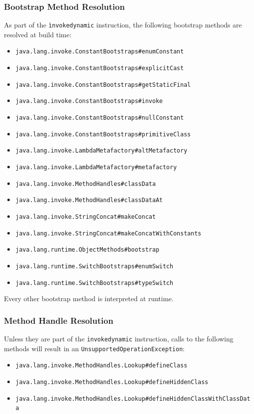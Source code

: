 \subsubsection{Bootstrap Method Resolution}\label{bootstrap_method_resolution}
As part of the \texttt{ìnvokedynamic} instruction, the following bootstrap methods are resolved at build time:
\begin{itemize}
    \item \texttt{java.lang.invoke.ConstantBootstraps\#enumConstant} 
    \item \texttt{java.lang.invoke.ConstantBootstraps\#explicitCast} 
    \item \texttt{java.lang.invoke.ConstantBootstraps\#getStaticFinal} 
    \item \texttt{java.lang.invoke.ConstantBootstraps\#invoke} 
    \item \texttt{java.lang.invoke.ConstantBootstraps\#nullConstant} 
    \item \texttt{java.lang.invoke.ConstantBootstraps\#primitiveClass} 
    \item \texttt{java.lang.invoke.LambdaMetafactory\#altMetafactory} 
    \item \texttt{java.lang.invoke.LambdaMetafactory\#metafactory} 
    \item \texttt{java.lang.invoke.MethodHandles\#classData} 
    \item \texttt{java.lang.invoke.MethodHandles\#classDataAt} 
    \item \texttt{java.lang.invoke.StringConcat\#makeConcat} 
    \item \texttt{java.lang.invoke.StringConcat\#makeConcatWithConstants} 
    \item \texttt{java.lang.runtime.ObjectMethods\#bootstrap} 
    \item \texttt{java.lang.runtime.SwitchBootstraps\#enumSwitch}
    \item \texttt{java.lang.runtime.SwitchBootstraps\#typeSwitch} 
\end{itemize}
Every other bootstrap method is interpreted at runtime.

\subsubsection{Method Handle Resolution}
Unless they are part of the \texttt{invokedynamic} instruction, calls to the following methods will result in an \texttt{UnsupportedOperationException}:
\begin{itemize}
    \item \texttt{java.lang.invoke.MethodHandles.Lookup\#defineClass} 
    \item \texttt{java.lang.invoke.MethodHandles.Lookup\#defineHiddenClass} 
    \item \texttt{java.lang.invoke.MethodHandles.Lookup\#defineHiddenClassWithClassData}
\end{itemize}


